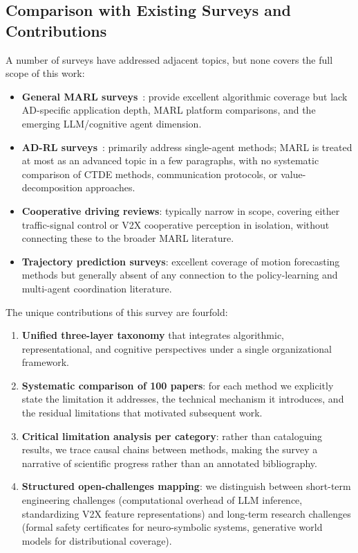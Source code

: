 \documentclass[12pt, a4paper]{article}
\begin{document}
\subsection{Comparison with Existing Surveys and Contributions}
\label{sec:comparison}

A number of surveys have addressed adjacent topics, but none covers the
full scope of this work:

\begin{itemize}[noitemsep]
  \item \textbf{General MARL surveys}~\cite{busoniu2008comprehensive,zhang2021multi}:
        provide excellent algorithmic coverage but lack AD-specific
        application depth, MARL platform comparisons, and the emerging
        LLM/cognitive agent dimension.
  \item \textbf{AD-RL surveys}~\cite{kiran2021deep,sallab2017deep}:
        primarily address single-agent methods; MARL is treated at
        most as an advanced topic in a few paragraphs, with no systematic
        comparison of CTDE methods, communication protocols, or
        value-decomposition approaches.
  \item \textbf{Cooperative driving reviews}: typically narrow in scope,
        covering either traffic-signal control or V2X cooperative
        perception in isolation, without connecting these to the broader
        MARL literature.
  \item \textbf{Trajectory prediction surveys}: excellent coverage of
        motion forecasting methods but generally absent of any connection
        to the policy-learning and multi-agent coordination literature.
\end{itemize}

The unique contributions of this survey are fourfold:
\begin{enumerate}[noitemsep]
  \item \textbf{Unified three-layer taxonomy} that integrates algorithmic,
        representational, and cognitive perspectives under a single
        organizational framework.
  \item \textbf{Systematic comparison of 100 papers}: for each method
        we explicitly state the limitation it addresses, the technical
        mechanism it introduces, and the residual limitations that
        motivated subsequent work.
  \item \textbf{Critical limitation analysis per category}: rather than
        cataloguing results, we trace causal chains between methods,
        making the survey a narrative of scientific progress rather than
        an annotated bibliography.
  \item \textbf{Structured open-challenges mapping}: we distinguish
        between short-term engineering challenges (computational overhead
        of LLM inference, standardizing V2X feature representations)
        and long-term research challenges (formal safety certificates for
        neuro-symbolic systems, generative world models for distributional
        coverage).
\end{enumerate}
\end{document}

